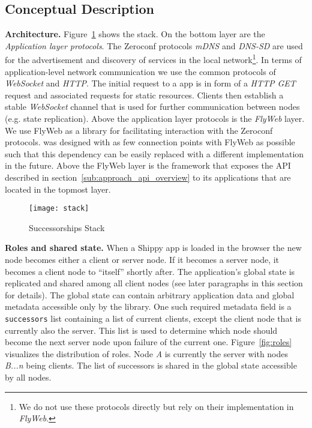 \subsection{Conceptual Description}
\label{sub:approach_conceptual_description}

\textbf{Architecture.} 
Figure~\ref{fig:stack} shows the \APIName stack.
On the bottom layer are the \textit{Application layer protocols}.
The Zeroconf protocols \textit{mDNS} and \textit{DNS-SD} are used for the advertisement and discovery of \APIshort services in the local network\footnote{We do not use these protocols directly but rely on their implementation in \textit{FlyWeb}.}. 
In terms of application-level network communication we use the common protocols of \textit{WebSocket} and \textit{HTTP}. 
The initial request to a \APIshort app is in form of a \textit{HTTP GET} request and associated requests for static resources.  Clients then establish a stable \textit{WebSocket} channel that is used for further communication between nodes (e.g. state replication). 
Above the application layer protocols is the \textit{FlyWeb} layer. 
We use FlyWeb as a library for facilitating interaction with the Zeroconf protocols. 
\APIName was designed with as few connection points with FlyWeb as possible such that this dependency can be easily replaced with a different implementation in the future. 
Above the FlyWeb layer is the \textit{\APIName} framework that exposes the API described in section~\ref{sub:approach_api_overview} to its applications that are located in the topmost layer.

\begin{figure}[h]
    \centering
    \texttt{[image: stack]}
    \caption{Successorships Stack}
    \label{fig:stack}
\end{figure}

\noindent\textbf{Roles and shared state.} When a Shippy app is loaded in the browser the new node becomes either a client or server node. If it becomes a server node, it becomes a client node to ``itself'' shortly after. The application's global state is replicated and shared among all client nodes (see later paragraphs in this section for details). The global state can contain arbitrary application data and global metadata accessible only by the \APIshort library. One such required metadata field is a \texttt{successors} list containing a list of current clients, except the client node that is currently also the server. This list is used to determine which node should become the next server node upon failure of the current one. Figure~\ref{fig:roles} visualizes the distribution of roles. Node \textit{A} is currently the server with nodes \textit{B...n} being clients. The list of successors is shared in the global state accessible by all nodes.

